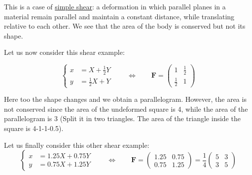 This is a case of \underline{simple shear}: a deformation in which parallel planes in a material remain 
parallel and maintain a constant distance, while translating relative to each other. 
We see that the area of the body is conserved but not its shape.


Let us now consider this shear example:

\begin{equation}
\begin{cases} 
x &=X + \frac12 Y \\ 
y &=\frac12 X + Y 
\end{cases}
\qquad
\Leftrightarrow
\qquad
{\bm F} = 
\left(
\begin{array}{cc}
1 & \frac12 \\
\frac12 & 1
\end{array}
\right)
\label{eq:shearing1}
\end{equation}

\begin{center}
\end{center}

Here too the shape changes and we obtain a parallelogram. However, 
the area is not conserved since the area of the undeformed square is 4, 
while the area of the parallelogram is 3
(Split it in two triangles. The area of the triangle inside the square is 4-1-1-0.5).

Let us finally consider this other shear example:
\begin{equation}
\begin{cases} 
x &=1.25X + 0.75 Y \\ 
y &=0.75 X + 1.25Y 
\end{cases}
\qquad
\Leftrightarrow
\qquad
{\bm F} = 
\left(
\begin{array}{cc}
1.25 & 0.75 \\
0.75 & 1.25
\end{array}
\right)
=\frac14
\left(
\begin{array}{cc}
5 & 3 \\
3 & 5
\end{array}
\right)
\label{eq:shearing3}
\end{equation}

